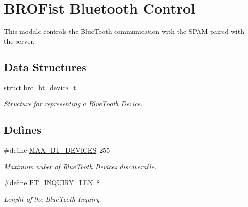 \hypertarget{group___bro_b_t}{
\section{BROFist Bluetooth Control}
\label{group___bro_b_t}
}


This module controls the BlueTooth communication with the SPAM paired with the server.  


\subsection*{Data Structures}
\begin{DoxyCompactItemize}
\item 
struct \hyperlink{structbro__bt__device__t}{bro\_\-bt\_\-device\_\-t}
\begin{DoxyCompactList}\small\item\em Structure for representing a BlueTooth Device. \item\end{DoxyCompactList}\end{DoxyCompactItemize}
\subsection*{Defines}
\begin{DoxyCompactItemize}
\item 
\#define \hyperlink{group___bro_b_t_gad8d503dc1b9bb10e606ac09669305612}{MAX\_\-BT\_\-DEVICES}~255
\begin{DoxyCompactList}\small\item\em Maximum nuber of BlueTooth Devices discoverable. \item\end{DoxyCompactList}\item 
\#define \hyperlink{group___bro_b_t_ga71ecc1aec5ed97ddbc4a321750a93a92}{BT\_\-INQUIRY\_\-LEN}~8
\begin{DoxyCompactList}\small\item\em Lenght of the BlueTooth Inquiry. \item\end{DoxyCompactList}\end{DoxyCompactItemize}
